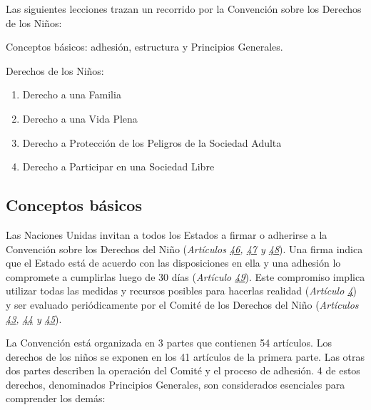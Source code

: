 \documentclass{tufte-handout}
\begin{document}
Las siguientes lecciones trazan un recorrido por la Convención sobre los Derechos de los Niños:

Conceptos básicos: adhesión, estructura y Principios Generales.

Derechos de los Niños:

\begin{enumerate}
\item{Derecho a una Familia}
\item{Derecho a una Vida Plena}
\item{Derecho a Protección de los Peligros de la Sociedad Adulta}
\item{Derecho a Participar en una Sociedad Libre}
\end{enumerate}

\subsection{Conceptos básicos}\label{subsec:conceptos}


Las Naciones Unidas invitan a todos los Estados a firmar o adherirse a la Convención sobre los Derechos del Niño (\textit{Artículos \href{https://procosi.github.io/nenes/convencion/?a=46}{46}, \href{https://procosi.github.io/nenes/convencion/?a=47}{47} y \href{https://procosi.github.io/nenes/convencion/?a=48}{48}}). Una firma indica que el Estado está de acuerdo con las disposiciones en ella y una adhesión lo compromete a cumplirlas luego de 30 días (\textit{Artículo \href{https://procosi.github.io/nenes/convencion/?a=49}{49}}). Este compromiso implica utilizar todas las medidas y recursos posibles para hacerlas realidad (\textit{Artículo \href{https://procosi.github.io/nenes/convencion/?a=4}{4}}) y ser evaluado periódicamente por el Comité de los Derechos del Niño (\textit{Artículos \href{https://procosi.github.io/nenes/convencion/?a=43}{43}, \href{https://procosi.github.io/nenes/convencion/?a=44}{44} y \href{https://procosi.github.io/nenes/convencion/?a=45}{45}}).

La Convención está organizada en 3 partes que contienen 54 artículos. Los derechos de los niños se exponen en los 41 artículos de la primera parte. Las otras dos partes describen la operación del Comité y el proceso de adhesión. 4 de estos derechos, denominados Principios Generales, son considerados esenciales para comprender los demás:
\end{document}
